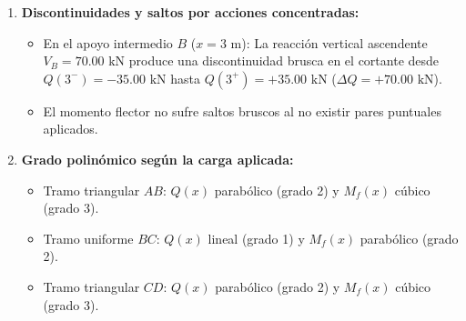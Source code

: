 {\begin{enumerate}
\begin{itemize}
                  \item Rótula intermedia $C$ ($x = 5\text{ m}$): El momento flector se anula: $M_f(5) = 0$.

                  \item Extremo derecho $D$ ($x = 11\text{ m}$): Cortante final $Q(11) = -10.00\text{ kN}$ (equilibrado por $V_D = 10.00\text{ kN}$ hacia arriba) y momento $M_f(11) = 0$.

              \end{itemize}



        \item \textbf{Discontinuidades y saltos por acciones concentradas:}

              \begin{itemize}

                  \item En el apoyo intermedio $B$ ($x = 3\text{ m}$): La reacción vertical ascendente $V_B = 70.00\text{ kN}$ produce una discontinuidad brusca en el cortante desde $Q(3^-) = -35.00\text{ kN}$ hasta $Q(3^+) = +35.00\text{ kN}$ ($\Delta Q = +70.00\text{ kN}$).

                  \item El momento flector no sufre saltos bruscos al no existir pares puntuales aplicados.

              \end{itemize}



        \item \textbf{Grado polinómico según la carga aplicada:}

              \begin{itemize}

                  \item Tramo triangular $AB$: $Q(x)$ parabólico (grado 2) y $M_f(x)$ cúbico (grado 3).

                  \item Tramo uniforme $BC$: $Q(x)$ lineal (grado 1) y $M_f(x)$ parabólico (grado 2).

                  \item Tramo triangular $CD$: $Q(x)$ parabólico (grado 2) y $M_f(x)$ cúbico (grado 3).

              \end{itemize}

    \end{enumerate}

}



